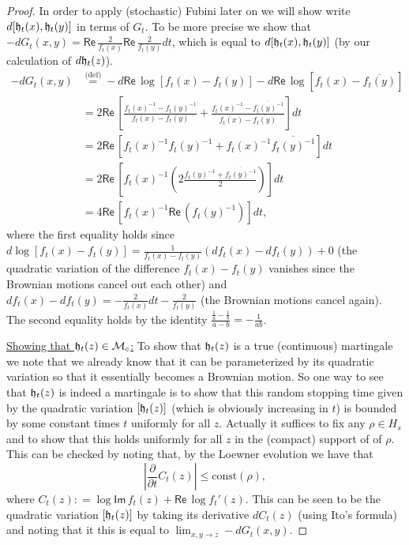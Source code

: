 \documentclass[11pt,reqno]{amsart}
\numberwithin{equation}{section}
\newcommand{\eqbydef}{\mathrel{\stackrel{\text{(def)}}{=}}}
\newcommand{\deq}{\mathrel{\mathop:}=}
\renewcommand{\Re}{\mathsf{Re}\,}
\renewcommand{\Im}{\mathsf{Im}\,}
\newcommand{\fh}{{\frak h}}
\begin{document}
\begin{proof}
	In order to apply (stochastic) Fubini later on we will show write $d[\fh_t(x),\fh_t(y)]$ in terms of $G_t$. To be more precise we show that $-dG_t(x,y)=\Re\frac{2}{f_t(x)}\Re\frac{2}{f_t(y)}dt$, which is equal to $d[\fh_t(x),\fh_t(y)]$ (by our calculation of $d\fh_t(z)$).
	\begin{align*}
		-dG_t(x,y)&\eqbydef -d\Re\log[f_t(x)-f_t(y)]-d\Re\log[f_t(x)-\overline{f_t(y)}]\\
		&=2\Re\left[\frac{f_t(x)^{-1}-f_t(y)^{-1}}{f_t(x)-f_t(y)}+\frac{f_t(x)^{-1}-\overline{f_t(y)^{-1}}}{f_t(x)-\overline{f_t(y)}}\right]dt\\
		&=2\Re\left[f_t(x)^{-1}f_t(y)^{-1}+f_t(x)^{-1}\overline{f_t(y)^{-1}}\right]dt\\
		&=2\Re\left[f_t(x)^{-1}\left(2\frac{f_t(y)^{-1}+\overline{f_t(y)^{-1}}}{2}\right)\right]dt\\
		&=4\Re\left[f_t(x)^{-1}\Re(f_t(y)^{-1})\right]dt,
	\end{align*}
	where the first equality holds since $d\log[f_t(x)-f_t(y)]=\frac{1}{f_t(x)-f_t(y)}(df_t(x)-df_t(y))+0$ (the quadratic variation of the difference $f_t(x)-f_t(y)$ vanishes since the Brownian motions cancel out each other) and $df_t(x)-df_t(y)=-\frac{2}{f_t(x)}dt-\frac{2}{f_t(y)}$ (the Brownian motions cancel again). The second equality holds by the identity $\frac{\frac{1}{a}-\frac{1}{b}}{a-b}=-\frac{1}{ab}$.
	
	\underline{Showing that $\fh_t(z)\in\mathcal M_c$:} To show that $\fh_t(z)$ is a true (continuous) martingale we note that we already know that it can be parameterized by its quadratic variation so that it essentially becomes a Brownian motion. So one way to see that $\fh_t(z)$ is indeed a martingale is to show that this random stopping time given by the quadratic variation $[\fh_t(z)]$ (which is obviously increasing in $t$) is bounded by some constant times $t$ uniformly for all $z$. Actually it suffices to fix any $\rho\in H_s$ and to show that this holds uniformly for all $z$ in the (compact) support of of $\rho$. This can be checked by noting that, by the Loewner evolution we have that $$|\frac{\partial}{\partial t} C_t(z)|\leq \text{const}(\rho),$$ where $C_t(z)\deq \log\Im f_t(z)+\Re\log f_t'(z)$. This can be seen to be the quadratic variation $[\fh_t(z)]$ by taking its derivative $dC_t(z)$ (using Ito's formula) and noting that it this is equal to $\lim_{x,y\rightarrow z} -dG_t(x,y)$.
	

\end{proof}
\end{document}
